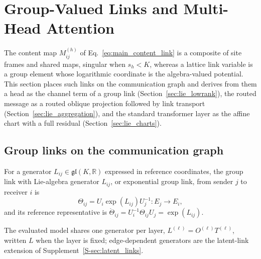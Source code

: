 \documentclass[twoside,11pt]{article}
\begin{document}

\section{Group-Valued Links and Multi-Head Attention}
\label{sec:lie_links}

The content map $M^{(h)}_{ij}$ of Eq.~\eqref{eq:main_content_link} is a composite of site frames and shared maps, singular when $s_h<K$, whereas a lattice link variable is a group element whose logarithmic coordinate is the algebra-valued potential. This section places such links on the communication graph and derives from them a head as the channel term of a group link (Section~\ref{sec:lie_lowrank}), the routed message as a routed oblique projection followed by link transport (Section~\ref{sec:lie_aggregation}), and the standard transformer layer as the affine chart with a full residual (Section~\ref{sec:lie_charts}).

\subsection{Group links on the communication graph}
\label{sec:lie_definition}

\begin{definition}
\label{def:lie_link}
For a generator $L_{ij}\in\mathfrak{gl}(K,\mathbb R)$ expressed in reference coordinates, the group link with Lie-algebra generator $L_{ij}$, or exponential group link, from sender $j$ to receiver $i$ is
\begin{equation}
\Theta_{ij}=U_i\exp(L_{ij})U_j^{-1}:E_j\longrightarrow E_i,
\label{eq:lie_link}
\end{equation}
and its reference representative is $\mathring\Theta_{ij}=U_i^{-1}\Theta_{ij}U_j=\exp(L_{ij})$.
\end{definition}

The evaluated model shares one generator per layer, $L^{(\ell)}=O^{(\ell)}T^{(\ell)}$, written $L$ when the layer is fixed; edge-dependent generators are the latent-link extension of Supplement~\ref{S-sec:latent_links}.
\end{document}
